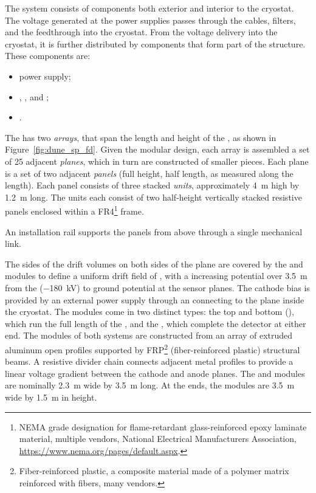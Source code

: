 The  system consists of components both exterior and interior to the cryostat. The voltage generated at the  power supplies passes through the cables, filters, and the  feedthrough into the cryostat. From the voltage delivery into the cryostat, it is further distributed by components that form part of the  structure. 
These components are:
\begin{itemize}
\item {} power supply;
\item {}, , and ;
\item {}.
\end{itemize}


The  has two  \textit{arrays}, that span the length and height of the , as shown in Figure~\ref{fig:dune_sp_fd}. Given the modular design, each array is assembled a set of 25 adjacent  \textit{planes}, which in turn are constructed of smaller pieces.  Each plane is a set of two adjacent \textit{panels} (full height, half length, as measured along the  length). Each panel consists of three stacked \textit{units}, approximately \SI{4}{\m} high by \SI{1.2}{\meter} long. The units each consist of two half-height vertically stacked resistive panels enclosed within a FR4\footnote{NEMA grade designation for flame-retardant glass-reinforced epoxy laminate material, multiple vendors, National Electrical Manufacturers Association\texttrademark{},  \url{https://www.nema.org/pages/default.aspx}.} frame.

An  installation rail supports the panels from above through a single mechanical link.

The sides of the drift volumes on both sides of the  plane are covered by the  and   modules to define a uniform drift field of \spmaxfield{}, with a increasing potential over \SI{3.5}{m} from the   (\SI{-180}{kV}) to ground potential at the  sensor planes. The cathode bias is provided by an external  power supply through an  \fdth connecting to the  plane inside the cryostat.
The  modules come in two distinct types: the top and bottom (), which run the full length of the , and the , %
which complete the detector at either end. The modules of both systems are constructed from an array of extruded aluminum open profiles supported by FRP\footnote{Fiber-reinforced plastic, a composite material made of a polymer matrix reinforced with fibers, many vendors.} (fiber-reinforced plastic) structural beams. A resistive divider chain connects adjacent metal profiles to provide a linear voltage gradient between the cathode and anode planes.  The  and  modules are nominally  \SI{2.3}{\meter} wide by  \SI{3.5}{\meter} long. At the ends, the  modules are \SI{3.5}{\meter} wide by \SI{1.5}{\meter} in height.

